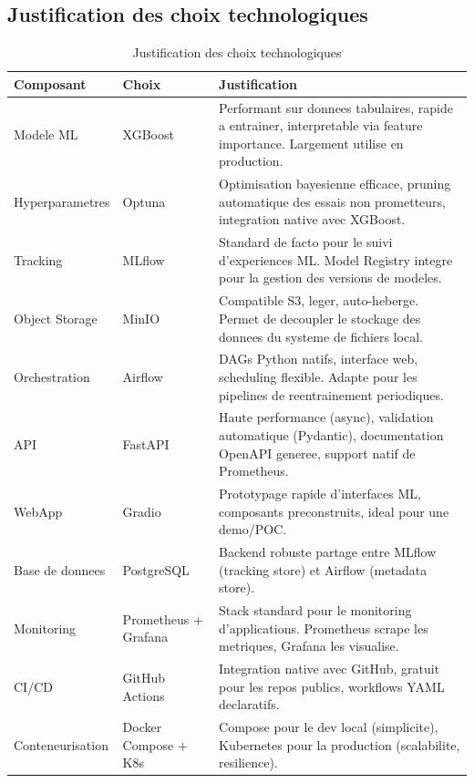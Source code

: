 \documentclass[a4paper,11pt]{article}
\begin{document}
\subsection{Justification des choix technologiques}

\begin{table}[h]
\centering
\small
\begin{tabular}{p{3cm}p{3cm}p{7cm}}
\toprule
\textbf{Composant} & \textbf{Choix} & \textbf{Justification} \\
\midrule
Modele ML & XGBoost & Performant sur donnees tabulaires, rapide a entrainer, interpretable via feature importance. Largement utilise en production. \\
\addlinespace
Hyperparametres & Optuna & Optimisation bayesienne efficace, pruning automatique des essais non prometteurs, integration native avec XGBoost. \\
\addlinespace
Tracking & MLflow & Standard de facto pour le suivi d'experiences ML. Model Registry integre pour la gestion des versions de modeles. \\
\addlinespace
Object Storage & MinIO & Compatible S3, leger, auto-heberge. Permet de decoupler le stockage des donnees du systeme de fichiers local. \\
\addlinespace
Orchestration & Airflow & DAGs Python natifs, interface web, scheduling flexible. Adapte pour les pipelines de reentrainement periodiques. \\
\addlinespace
API & FastAPI & Haute performance (async), validation automatique (Pydantic), documentation OpenAPI generee, support natif de Prometheus. \\
\addlinespace
WebApp & Gradio & Prototypage rapide d'interfaces ML, composants preconstruits, ideal pour une demo/POC. \\
\addlinespace
Base de donnees & PostgreSQL & Backend robuste partage entre MLflow (tracking store) et Airflow (metadata store). \\
\addlinespace
Monitoring & Prometheus + Grafana & Stack standard pour le monitoring d'applications. Prometheus scrape les metriques, Grafana les visualise. \\
\addlinespace
CI/CD & GitHub Actions & Integration native avec GitHub, gratuit pour les repos publics, workflows YAML declaratifs. \\
\addlinespace
Conteneurisation & Docker Compose + K8s & Compose pour le dev local (simplicite), Kubernetes pour la production (scalabilite, resilience). \\
\bottomrule
\end{tabular}
\caption{Justification des choix technologiques}
\end{table}
\end{document}
